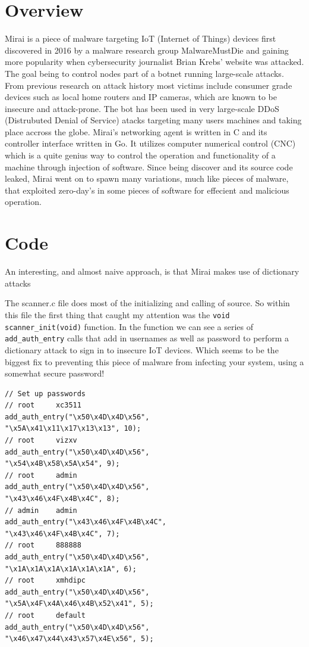 \documentclass[12pt, letterpaper]{article}
\begin{document}
\begin{sloppypar}


\begin{flushleft}
\section{Overview}
Mirai is a piece of malware targeting IoT (Internet of Things) devices first discovered 
in 2016 by a malware research group MalwareMustDie and gaining more popularity when 
cybersecurity journalist Brian Krebs' website was attacked. The goal being to 
control nodes part of a botnet running large-scale attacks. From previous research on 
attack history most victims include consumer grade devices such as local home routers 
and IP cameras, which are known to be insecure and attack-prone. The bot has been used 
in very large-scale DDoS (Distrubuted Denial of Service) atacks targeting many users 
machines and taking place accross the globe. Mirai's networking agent is written in C 
and its controller interface written in Go. It utilizes computer numerical control (CNC) 
which is a quite genius way to control the operation and functionality of a machine 
through injection of software. Since being discover and its source code leaked, Mirai 
went on to spawn many variations, much like pieces of malware, that exploited zero-day's 
in some pieces of software for effecient and malicious operation. 

\newpage

\section{Code}
An interesting, and almost naive approach, is that Mirai makes use of dictionary attacks

The scanner.c file does most of the initializing and calling of source. So within this
file the first thing that caught my attention was the \verb|void scanner_init(void)| 
function. In the function we can see a series of \verb|add_auth_entry| calls that add 
in usernames as well as password to perform a dictionary attack to sign in to insecure
IoT devices. Which seems to be the biggest fix to preventing this piece of malware from
infecting your system, using a somewhat secure password!

\begin{lstlisting}
// Set up passwords
// root     xc3511
add_auth_entry("\x50\x4D\x4D\x56", 
"\x5A\x41\x11\x17\x13\x13", 10);
// root     vizxv
add_auth_entry("\x50\x4D\x4D\x56", 
"\x54\x4B\x58\x5A\x54", 9);
// root     admin
add_auth_entry("\x50\x4D\x4D\x56",
"\x43\x46\x4F\x4B\x4C", 8);
// admin    admin
add_auth_entry("\x43\x46\x4F\x4B\x4C", 
"\x43\x46\x4F\x4B\x4C", 7);
// root     888888
add_auth_entry("\x50\x4D\x4D\x56", 
"\x1A\x1A\x1A\x1A\x1A\x1A", 6);
// root     xmhdipc
add_auth_entry("\x50\x4D\x4D\x56", 
"\x5A\x4F\x4A\x46\x4B\x52\x41", 5);
// root     default
add_auth_entry("\x50\x4D\x4D\x56", 
"\x46\x47\x44\x43\x57\x4E\x56", 5);
\end{lstlisting}



\end{flushleft}
\end{sloppypar}
\end{document}
